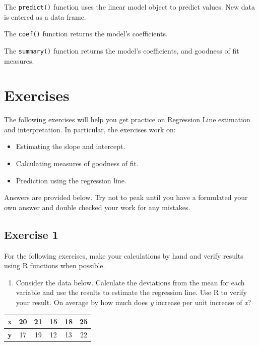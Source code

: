 \documentclass[
  letterpaper,
  DIV=11,
  numbers=noendperiod]{scrreprt}
\providecommand{\tightlist}{%
  \setlength{\itemsep}{0pt}\setlength{\parskip}{0pt}}\usepackage{longtable,booktabs,array}
\begin{document}
The \texttt{predict()} function uses the linear model object to predict
values. New data is entered as a data frame.

The \texttt{coef()} function returns the model's coefficients.

The \texttt{summary()} function returns the model's coefficients, and
goodness of fit measures.

\hypertarget{exercises-6}{%
\section{Exercises}\label{exercises-6}}

The following exercises will help you get practice on Regression Line
estimation and interpretation. In particular, the exercises work on:

\begin{itemize}
\item
  Estimating the slope and intercept.
\item
  Calculating measures of goodness of fit.
\item
  Prediction using the regression line.
\end{itemize}

Answers are provided below. Try not to peak until you have a formulated
your own answer and double checked your work for any mistakes.

\hypertarget{exercise-1-12}{%
\subsection*{Exercise 1}\label{exercise-1-12}}

For the following exercises, make your calculations by hand and verify
results using R functions when possible.

\begin{enumerate}
\def\labelenumi{\arabic{enumi}.}
\tightlist
\item
  Consider the data below. Calculate the deviations from the mean for
  each variable and use the results to estimate the regression line. Use
  R to verify your result. On average by how much does \emph{y} increase
  per unit increase of \emph{x}?
\end{enumerate}

\begin{longtable}[]{@{}cccccc@{}}
\toprule()
\textbf{x} & 20 & 21 & 15 & 18 & 25 \\
\midrule()
\endhead
\textbf{y} & 17 & 19 & 12 & 13 & 22 \\
\bottomrule()
\end{longtable}
\end{document}
